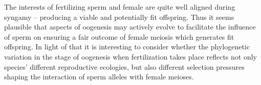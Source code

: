 \documentclass[12pt,letterpaper]{article}
\newcommand{\gc}[1]{{ \color{red} #1}}
\newcommand{\yb}[1]{{ \color{blue} #1}}
\begin{document}





The interests of fertilizing sperm and female are quite well aligned during syngamy -- producing a viable and potentially fit offspring. 
Thus it seems plausible that aspects of oogenesis may actively evolve to facilitate the influence of sperm on ensuring a fair  outcome of female meiosis which generates fit offspring.
In light of that it is interesting to consider whether the phylogenetic variation in the stage of oogenesis when fertilization takes place reflects not
	only species' different reproductive ecologies, but also different selection pressures shaping the interaction of sperm alleles with female meioses. 




  \appendix
\end{document}
